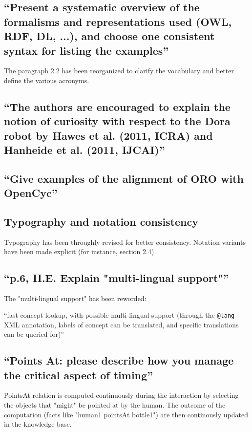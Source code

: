 \documentclass{article}
\begin{document}
\subsection{``Present a systematic overview of the formalisms and
representations used (OWL, RDF, DL, ...), and choose one consistent syntax for
listing the examples''}

The paragraph 2.2 has been reorganized to clarify the vocabulary and better
define the various acronyms.

\subsection{``The authors are encouraged to explain the notion of curiosity
with respect to the Dora robot by Hawes et al. (2011, ICRA) and Hanheide et al.
(2011, IJCAI)''}

\subsection{``Give examples of the alignment of ORO with OpenCyc''}

\subsection{Typography and notation consistency}

Typography has been throughly revised for better consistency. Notation variants have been
made explicit (for instance, section 2.4).

\subsection{``p.6, II.E. Explain "multi-lingual support"''}

The "multi-lingual support" has been reworded:

``fast concept lookup, with possible multi-lingual support (through the
{\tt @lang} XML annotation, labels of concept can be translated, and
specific translations can be queried for)''


\subsection{``Points At: please describe how you manage the critical aspect of
timing''}

PointsAt relation is computed continuously during the interaction by 
selecting the objects that "might" be pointed at by the human. The outcome
of the computation (facts like "human1 pointsAt bottle1") are then
continously updated in the knowledge base.
\end{document}
